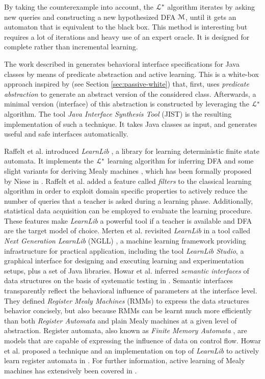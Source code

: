 By taking the counterexample into account, the $\EuScript{L}^*$
algorithm iterates by asking new queries and constructing a new
hypothesized DFA $\EuScript{M}$, until it gets an automaton that
is equivalent to the black box.  This method is interesting but
requires a lot of iterations and heavy use of an expert oracle.
It is designed for complete rather than incremental learning.

The work described in \cite{Alur:2005:SIS:1047659.1040314}
generates behavioral interface specifications for Java classes by
means of predicate abstraction and active learning. This is a
white-box approach inspired by
\cite{Whaley:2002:AEO:566171.566212} (see Section
\ref{sec:passive-white}) that, first, uses \textit{predicate
abstraction} to generate an abstract version of the considered
class. Afterwards, a minimal version (interface) of this
abstraction is constructed by leveraging the $\EuScript{L}^*$
algorithm. The tool \textit{Java Interface Synthesis Tool} (JIST)
is the resulting implementation of such a technique. It takes
Java classes as input, and generates useful and safe interfaces
automatically.

Raffelt et al. introduced \textit{LearnLib}
\cite{Raffelt:2005:LLA:1081180.1081189}, a library for learning
deterministic finite state automata. It implements the
$\EuScript{L}^*$ \cite{Angluin198787} learning algorithm for
inferring DFA and some slight variants for deriving Mealy
machines \cite{6771467}, which has been formally proposed by
Niese in \cite{DBLP:phd/de/Niese2003}.  Raffelt et al. added a
feature called \textit{filters} to the classical learning
algorithm in order to exploit domain specific properties to
actively reduce the number of queries that a teacher is asked
during a learning phase.
Additionally, statistical data acquisition can be employed to
evaluate the learning procedure. These features make
\textit{LearnLib} a powerful tool if a teacher is available and
DFA are the target model of choice.  Merten et al. revisited
\textit{LearnLib} in a tool called \textit{Next Generation
LearnLib} (NGLL) \cite{ngll11}, a machine learning framework
providing infrastructure for practical application, including the
tool \textit{LearnLib Studio}, a graphical interface for
designing and executing learning and experimentation setups, plus
a set of Java libraries. Howar et al. inferred \textit{semantic
interfaces} of data structures on the basis of systematic testing
in \cite{howar2012}. Semantic interfaces transparently reflect
the behavioral influence of parameters at the interface level.
They defined \textit{Register Mealy Machines} (RMMs) to express
the data structures behavior concisely, but also because RMMs can
be learnt much more efficiently than both \textit{Register
Automata} and plain Mealy machines at a given level of
abstraction. Register automata, also known as \textit{Finite
Memory Automata} \cite{Kaminski1994329}, are models that are
capable of expressing the influence of data on control flow.
Howar et al. proposed a technique and an implementation on top of
\textit{LearnLib} to actively learn register automata in
\cite{howarRA2012}. For further information, active learning of
Mealy machines has extensively been covered in \cite{steffen11}.

